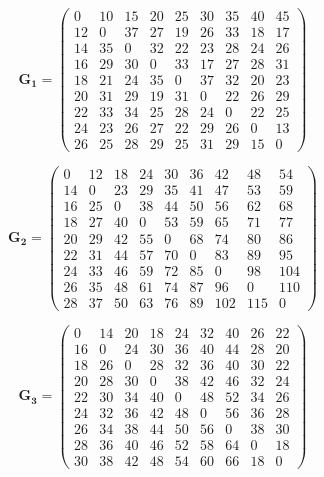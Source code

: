 \begin{equation}
    \mathbf{G_1} =
    \begin{pmatrix}
        0 & 10 & 15 & 20 & 25 & 30 & 35 & 40 & 45 \\
        12 & 0 & 37 & 27 & 19 & 26 & 33 & 18 & 17 \\
        14 & 35 & 0 & 32 & 22 & 23 & 28 & 24 & 26 \\
        16 & 29 & 30 & 0 & 33 & 17 & 27 & 28 & 31 \\
        18 & 21 & 24 & 35 & 0 & 37 & 32 & 20 & 23 \\
        20 & 31 & 29 & 19 & 31 & 0 & 22 & 26 & 29 \\
        22 & 33 & 34 & 25 & 28 & 24 & 0 & 22 & 25 \\
        24 & 23 & 26 & 27 & 22 & 29 & 26 & 0 & 13 \\
        26 & 25 & 28 & 29 & 25 & 31 & 29 & 15 & 0
    \end{pmatrix}
\end{equation}

\begin{equation}
    \mathbf{G_2} =
    \begin{pmatrix}
        0 & 12 & 18 & 24 & 30 & 36 & 42 & 48 & 54 \\
        14 & 0 & 23 & 29 & 35 & 41 & 47 & 53 & 59 \\
        16 & 25 & 0 & 38 & 44 & 50 & 56 & 62 & 68 \\
        18 & 27 & 40 & 0 & 53 & 59 & 65 & 71 & 77 \\
        20 & 29 & 42 & 55 & 0 & 68 & 74 & 80 & 86 \\
        22 & 31 & 44 & 57 & 70 & 0 & 83 & 89 & 95 \\
        24 & 33 & 46 & 59 & 72 & 85 & 0 & 98 & 104 \\
        26 & 35 & 48 & 61 & 74 & 87 & 96 & 0 & 110 \\
        28 & 37 & 50 & 63 & 76 & 89 & 102 & 115 & 0
    \end{pmatrix}
\end{equation}

\begin{equation}
    \mathbf{G_3} =
    \begin{pmatrix}
        0 & 14 & 20 & 18 & 24 & 32 & 40 & 26 & 22 \\
        16 & 0 & 24 & 30 & 36 & 40 & 44 & 28 & 20 \\
        18 & 26 & 0 & 28 & 32 & 36 & 40 & 30 & 22 \\
        20 & 28 & 30 & 0 & 38 & 42 & 46 & 32 & 24 \\
        22 & 30 & 34 & 40 & 0 & 48 & 52 & 34 & 26 \\
        24 & 32 & 36 & 42 & 48 & 0 & 56 & 36 & 28 \\
        26 & 34 & 38 & 44 & 50 & 56 & 0 & 38 & 30 \\
        28 & 36 & 40 & 46 & 52 & 58 & 64 & 0 & 18 \\
        30 & 38 & 42 & 48 & 54 & 60 & 66 & 18 & 0
    \end{pmatrix}
\end{equation}

